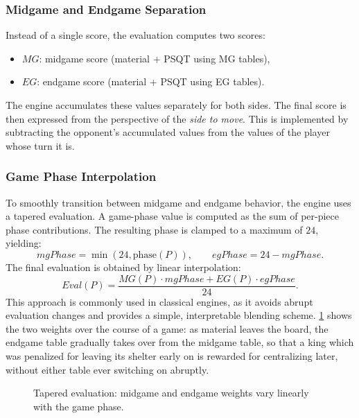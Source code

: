 \subsubsection{Midgame and Endgame Separation}
\label{subsec:mg_eg}

Instead of a single score, the evaluation computes two scores:
\begin{itemize}
    \item $MG$: midgame score (material + PSQT using MG tables),
    \item $EG$: endgame score (material + PSQT using EG tables).
\end{itemize}

The engine accumulates these values separately for both sides. The final score
is then expressed from the perspective of the \emph{side to move}. This is
implemented by subtracting the opponent's accumulated values from the values of
the player whose turn it is.

\subsubsection{Game Phase Interpolation}
\label{subsec:phase_interpolation}

To smoothly transition between midgame and endgame behavior, the engine uses a
tapered evaluation. A game-phase value is computed as the sum of per-piece phase
contributions. The resulting phase is clamped to a maximum of $24$, yielding:
\[
mgPhase = \min(24, \text{phase}(P)), \qquad egPhase = 24 - mgPhase.
\]
The final evaluation is obtained by linear interpolation:
\[
Eval(P) = \frac{MG(P)\cdot mgPhase + EG(P)\cdot egPhase}{24}.
\]
This approach is commonly used in classical engines, as it avoids abrupt
evaluation changes and provides a simple, interpretable blending scheme.
\cref{fig:tapered_eval} shows the two weights over the course of a game: as
material leaves the board, the endgame table gradually takes over from the
midgame table, so that a king which was penalized for leaving its shelter early
on is rewarded for centralizing later, without either table ever switching on
abruptly.

\begin{figure}[ht]
\centering
{}
\caption{Tapered evaluation: midgame and endgame weights vary linearly with the
game phase.}
\label{fig:tapered_eval}
\end{figure}

